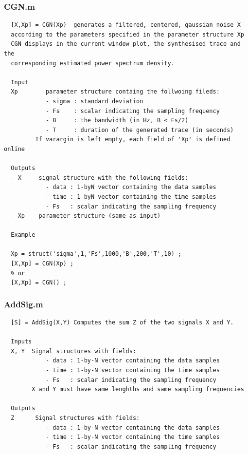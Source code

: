\documentclass{article}
\begin{document}
\subsubsection{CGN.m}

        \color{lightgray} \begin{verbatim}  [X,Xp] = CGN(Xp)  generates a filtered, centered, gaussian noise X
  according to the parameters specified in the parameter structure Xp
  CGN displays in the current window plot, the synthesised trace and the
  corresponding estimated power spectrum density. 
 
  Input
  Xp        parameter structure containg the follwoing fileds:
            - sigma : standard deviation
            - Fs    : scalar indicating the sampling frequency
            - B     : the bandwidth (in Hz, B < Fs/2)
            - T     : duration of the generated trace (in seconds)
         If varargin is left empty, each field of 'Xp' is defined online
 
  Outputs
  - X     signal structure with the following fields:
            - data : 1-byN vector containing the data samples
            - time : 1-byN vector containing the time samples
            - Fs   : scalar indicating the sampling frequency
  - Xp    parameter structure (same as input)
 
  Example
 
  Xp = struct('sigma',1,'Fs',1000,'B',200,'T',10) ;
  [X,Xp] = CGN(Xp) ;
  % or 
  [X,Xp] = CGN() ;
\end{verbatim} \color{black}
    


\subsubsection{AddSig.m}

        \color{lightgray} \begin{verbatim}  [S] = AddSig(X,Y) Computes the sum Z of the two signals X and Y.
 
  Inputs
  X, Y  Signal structures with fields:
            - data : 1-by-N vector containing the data samples
            - time : 1-by-N vector containing the time samples
            - Fs   : scalar indicating the sampling frequency
        X and Y must have same lenghths and same sampling frequencies
 
  Outputs
  Z      Signal structures with fields:
            - data : 1-by-N vector containing the data samples
            - time : 1-by-N vector containing the time samples
            - Fs   : scalar indicating the sampling frequency
\end{verbatim} \color{black}
\end{document}
